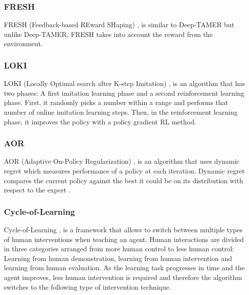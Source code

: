 \subsubsection*{FRESH}
FRESH (Feedback-based REward SHaping) \cite{FRESH-xiao:2020}, is similar to Deep-TAMER \cite{DeepTAMER-Warnell-et-al:2018} but unlike Deep-TAMER, FRESH takes into account the reward from the environment.



\subsubsection*{LOKI}
LOKI (Locally Optimal search after K-step Imitation) \cite{LOKI-Cheng:2018}, is an algorithm that has two phases: A first imitation learning phase and a second reinforcement learning phase. First, it randomly picks a number within a range and performs that number of online imitation learning steps. Then, in the reinforcement learning phase, it improves the policy with a policy gradient RL method.










\subsubsection*{AOR}
AOR (Adaptive On-Policy Regularization) \cite{AOR-lee-laskey:2019}, is an algorithm that uses dynamic regret which measures performance of a policy at each iteration. Dynamic regret compares the current  policy  against  the  best  it  could  be  on  its  distribution with  respect  to  the  expert \cite{Dynamic-regret-Laskey:2018}.  

















\subsubsection*{Cycle-of-Learning}
Cycle-of-Learning \cite{Cycle-of-Learning-waytowich:2018},  is a framework that allows to switch between multiple types of human interventions when teaching an agent. Human interactions are divided in three categories arranged from more human control to less human control: Learning from human demonstration, learning from human intervention and learning from human evaluation. As the learning task progresses in time and the agent improves, less human intervention is required and therefore the algorithm switches to the following type of intervention technique.

